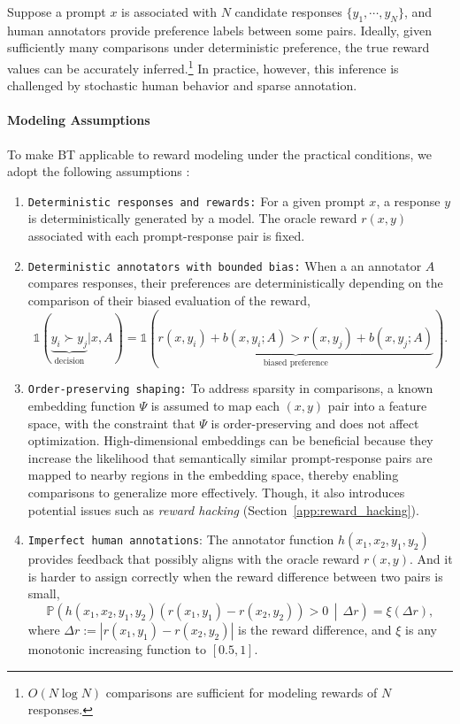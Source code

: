 Suppose a prompt $x$ is associated with $N$ candidate responses $\{y_1, \cdots, y_N\}$, and human annotators provide preference labels between some pairs. Ideally, given sufficiently many comparisons under deterministic preference, the true reward values can be accurately inferred.\footnote{$O(N \log N)$ comparisons are sufficient for modeling rewards of $N$ responses.} In practice, however, this inference is challenged by stochastic human behavior and sparse annotation.

\paragraph{Modeling Assumptions} 
To make BT applicable to reward modeling under the practical conditions, we adopt the following assumptions \cite{sun2025rethinkingbradleyterrymodelspreferencebased}:
\begin{enumerate}
    \item \texttt{Deterministic responses and rewards:} For a given prompt $x$, a response $y$ is deterministically generated by a model. The oracle reward $r(x, y)$ associated with each prompt-response pair is fixed.
    \item \texttt{Deterministic annotators with bounded bias:} When a an annotator $A$ compares responses, their preferences are deterministically depending on the comparison of their biased evaluation of the reward,
    \begin{equation}
        \mathds{1} ( \underbrace{y_i \succ y_j}_\text{decision} | x, A ) = \mathds{1} (\underbrace{r(x,y_i) + b(x, y_i; A) > r(x,y_j) + b(x, y_j; A)}_\text{biased preference} ).
    \end{equation}
    
    \item \texttt{Order-preserving shaping:} To address sparsity in comparisons, a known embedding function $\Psi$ is assumed to map each $(x, y)$ pair into a feature space, with the constraint that $\Psi$ is order-preserving and does not affect optimization. High-dimensional embeddings can be beneficial because they increase the likelihood that semantically similar prompt-response pairs are mapped to nearby regions in the embedding space, thereby enabling comparisons to generalize more effectively. Though, it also introduces potential issues such as \textit{reward hacking} (Section~\ref{app:reward_hacking}).

    \item \texttt{Imperfect human annotations}: The annotator function $h(x_1, x_2, y_1, y_2)$ provides feedback that possibly aligns with the oracle reward $r(x, y)$. And it is harder to assign correctly when the reward difference between two pairs is small,
\begin{equation}
\mathbb{P}\left( h(x_1, x_2, y_1, y_2)(r(x_1, y_1) - r(x_2, y_2)) > 0 \,\middle|\, \Delta r \right) = \xi(\Delta r), 
\end{equation}
where $\Delta r := |r(x_1, y_1) - r(x_2, y_2)|$ is the reward difference, and $\xi$ is any monotonic increasing function to $[0.5, 1]$.
\end{enumerate}

